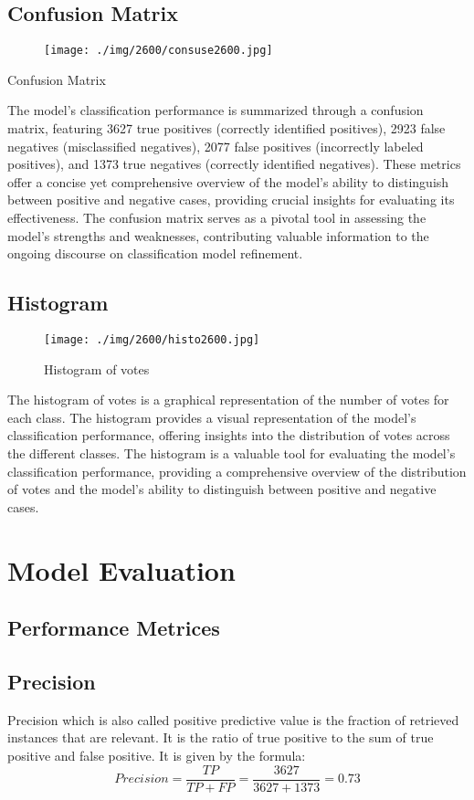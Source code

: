 \subsection{Confusion Matrix}
\begin{table}[H]
\begin{figure}[H]
    \centering
    \texttt{[image: ./img/2600/consuse2600.jpg]}
\end{figure}
\caption{Confusion Matrix}
\end{table}
The model's classification performance is summarized through a confusion matrix, featuring 3627 true positives (correctly identified positives), 2923 false negatives (misclassified negatives), 2077 false positives (incorrectly labeled positives), and 1373 true negatives (correctly identified negatives). These metrics offer a concise yet comprehensive overview of the model's ability to distinguish between positive and negative cases, providing crucial insights for evaluating its effectiveness. The confusion matrix serves as a pivotal tool in assessing the model's strengths and weaknesses, contributing valuable information to the ongoing discourse on classification model refinement.
\subsection{Histogram}
\begin{figure}[H]
    \centering
    \texttt{[image: ./img/2600/histo2600.jpg]}
    \caption{Histogram of votes}
\end{figure}
The histogram of votes is a graphical representation of the number of votes for each class. The histogram provides a visual representation of the model's classification performance, offering insights into the distribution of votes across the different classes. The histogram is a valuable tool for evaluating the model's classification performance, providing a comprehensive overview of the distribution of votes and the model's ability to distinguish between positive and negative cases.

\section{Model Evaluation}
\subsection{Performance Metrices}
\subsection*{Precision}
Precision which is also called positive predictive value is the fraction of retrieved instances that are relevant. It is the ratio of true positive to the sum of true positive and false positive. It is given by the formula:
$$Precision = \frac{TP}{TP+FP} = \frac{3627}{3627+1373} = 0.73 $$
